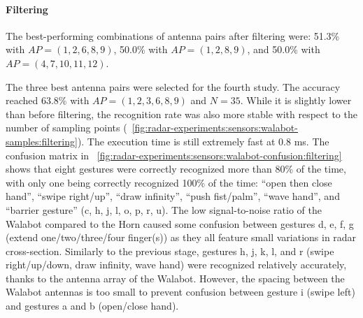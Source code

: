\paragraph{Filtering}
The best-performing combinations of antenna pairs after filtering were: 51.3\% with $AP{=}(1, 2, 6, 8, 9)$, 50.0\% with $AP{=}(1, 2, 8, 9)$, and 50.0\% with $AP{=}(4, 7, 10, 11, 12)$.

The three best antenna pairs were selected for the fourth study. 
The accuracy reached 63.8\% with $AP{=}(1, 2, 3, 6, 8, 9)$ and $N{=}35$. While it is slightly lower than before filtering, the recognition rate was also more stable with respect to the number of sampling points (\fig~\ref{fig:radar-experiments:sensors:walabot-samples:filtering}).
The execution time is still extremely fast at 0.8 ms. 
%
The confusion matrix in \fig~\ref{fig:radar-experiments:sensors:walabot-confusion:filtering} shows that eight gestures were correctly recognized more than 80\% of the time, with only one being correctly recognized 100\% of the time: ``open then close hand'', ``swipe right/up'', ``draw infinity'', ``push fist/palm'', ``wave hand'', and ``barrier gesture'' (c, h, j, l, o, p, r, u).
%
The low signal-to-noise ratio of the Walabot compared to the Horn caused some confusion between gestures d, e, f, g (extend one/two/three/four finger(s)) as they all feature small variations in radar cross-section.
%
Similarly to the previous stage, gestures h, j, k, l, and r (swipe right/up/down, draw infinity, wave hand) were recognized relatively accurately, thanks to the antenna array of the Walabot.
%
However, the spacing between the Walabot antennas is too small to prevent confusion between gesture i (swipe left) and gestures a and b (open/close hand).

